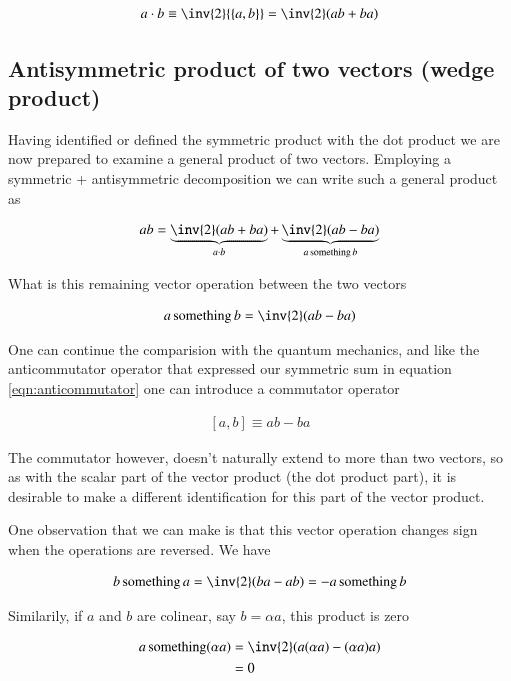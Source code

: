 \documentclass{article}
\newcommand{\symmetric}[2]{{\left\{{#1},{#2}\right\}}}
\newcommand{\antisymmetric}[2]{\left[{#1},{#2}\right]}
\DeclareMathOperator{\something}{something}
\begin{document}
\begin{align}\label{eqn:dotDefined}
a \cdot b \equiv \inv{2} \symmetric{a}{b} = \inv{2} (a b + ba)
\end{align}

\subsection{ Antisymmetric product of two vectors (wedge product) }

Having identified or defined the symmetric product with the dot product we are now prepared to examine a general product of two vectors.  Employing a symmetric + antisymmetric decomposition we can write such a general product as

\begin{align*}
a b = \underbrace{\inv{2}(a b + b a)}_{a \cdot b} + \underbrace{ \inv{2} ( a b - b a ) }_{ a \something b }
\end{align*}

What is this remaining vector operation between the two vectors

\begin{align*}
a \something b = \inv{2} ( a b - b a )
\end{align*}

One can continue the comparision with the quantum mechanics, and like the
anticommutator operator that expressed our symmetric sum in equation
\ref{eqn:anticommutator} one can introduce a commutator operator

\begin{align}\label{eqn:commutator}
\antisymmetric{a}{b} \equiv a b - b a
\end{align}

The commutator however, doesn't naturally extend to more than two vectors, so
as with the scalar part of the vector product (the dot product part), 
it is desirable to make a different identification for this part of the vector
product.

One observation that we can make is that this vector operation changes sign when the operations are reversed.  We have

\begin{align*}
b \something a = \inv{2} ( b a - a b) = - a \something b
\end{align*}

Similarily, if $a$ and $b$ are colinear, say $b = \alpha a$, this product is zero

\begin{align*}
a \something (\alpha a)
&= \inv{2} ( a  (\alpha a) - (\alpha a) a ) \\
&= 0
\end{align*}
\end{document}
